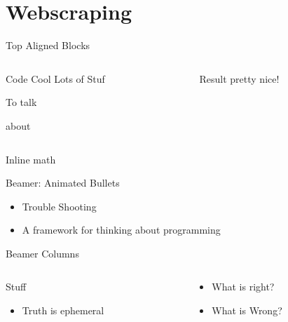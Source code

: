 \documentclass[presentation]{beamer}
\begin{document}
\section{Webscraping}
\label{sec-5}

\begin{frame}[label=sec-6-1]{Top Aligned Blocks}
\begin{columns}
\begin{column}{0.5\textwidth}
\begin{block}{Code}
Cool
Lots
of Stuf

To talk

about
\end{block}
\end{column}
\begin{column}{0.5\textwidth}
\begin{block}{Result}
pretty nice!
\end{block}
\end{column}
\end{columns}
\end{frame}

\begin{frame}[label=sec-6-2]{Inline math}
\end{frame}


\begin{frame}[label=sec-6-3]{Beamer: Animated Bullets}
\begin{itemize}[<+->]
\item Trouble Shooting
\item A framework for thinking about programming
\end{itemize}
\end{frame}

\begin{frame}[label=sec-6-4]{Beamer Columns}
\begin{columns}
\begin{column}{0.5\textwidth}
\begin{block}{Stuff}
\begin{itemize}
\item Truth is ephemeral
\end{itemize}
\end{block}
\end{column}

\begin{column}{0.5\textwidth}
\begin{itemize}
\item What is right?
\item What is Wrong?
\end{itemize}
\end{column}
\end{columns}
\end{frame}
\end{document}
